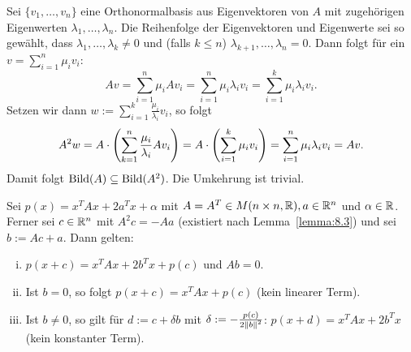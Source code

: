 \begin{beweis}
	Sei $\{v_1,\dots,v_n\}$ eine Orthonormalbasis aus Eigenvektoren von $A$ mit zugehörigen Eigenwerten $\lambda_1,\dots,\lambda_n$.
	Die Reihenfolge der Eigenvektoren und Eigenwerte sei so gewählt, dass $\lambda_1,\dots,\lambda_k \neq 0$ und (falls $k \leq n$) $\lambda_{k+1}, \dots, \lambda_n = 0$.
	Dann folgt für ein $v = \sum_{i=1}^{n} \mu_i v_i$:
	\[
		Av = \sum_{i=1}^{n} \mu_i Av_i = \sum_{i=1}^{n} \mu_i \lambda_i v_i = \sum_{i=1}^{k} \mu_i \lambda_i v_i.
	\]
	Setzen wir dann $w := \sum_{i=1}^{k} \frac{\mu_i}{\lambda_i} v_i$, so folgt
	\[
		A^2w = A \cdot \left(\sum_{k=1}^{n} \frac{\mu_i}{\lambda_i} Av_i\right) = A \cdot \left(\sum_{i=1}^{k} \mu_i v_i\right) = \sum_{i=1}^{n} \mu_i \lambda_i v_i = Av.
	\]
	Damit folgt $\operatorname{Bild}(A) \subseteq \operatorname{Bild}(A^2)$.
	Die Umkehrung ist trivial. 
\end{beweis}

\begin{lemma}
	\label{lemma:8.4}
	Sei $p(x) = x^T A x + 2a^Tx + \alpha$ mit $A = A^T \in M(n \times n, \mathbb{R}), a \in \mathbb{R}^n$ und $\alpha \in \mathbb{R}$.
	Ferner sei $c \in \mathbb{R}^n$ mit $A^2c = -Aa$ (existiert nach Lemma~\ref{lemma:8.3}) und sei $b := Ac + a$.
	Dann gelten:
	\begin{enumerate}[(i)]
		\item $p(x+c) = x^T Ax + 2b^Tx + p(c)$ und $Ab = 0$.
		\item Ist $b = 0$, so folgt $p(x+c) = x^TAx + p(c)$ (kein linearer Term).
		\item Ist $b \neq 0$, so gilt für $d := c+\delta b$ mit $\delta := - \frac{p(c)}{2 \left\lVert b\right\rVert^2}$: $p(x+d) = x^TAx + 2b^Tx$ (kein konstanter Term).
	\end{enumerate}
\end{lemma}

